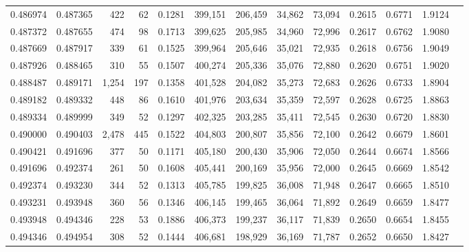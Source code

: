 \begin{tabular}{rrrrrrrrrrrrr}
0.486974 & 0.487365 &   422 &  62 &                                     0.1281 & 399,151 & 206,459 &  34,862 &  73,094 & 0.2615 & 0.6771 & 1.9124 \\
0.487372 & 0.487655 &   474 &  98 &                                     0.1713 & 399,625 & 205,985 &  34,960 &  72,996 & 0.2617 & 0.6762 & 1.9080 \\
0.487669 & 0.487917 &   339 &  61 &                                     0.1525 & 399,964 & 205,646 &  35,021 &  72,935 & 0.2618 & 0.6756 & 1.9049 \\
0.487926 & 0.488465 &   310 &  55 &                                     0.1507 & 400,274 & 205,336 &  35,076 &  72,880 & 0.2620 & 0.6751 & 1.9020 \\
0.488487 & 0.489171 & 1,254 & 197 &                                     0.1358 & 401,528 & 204,082 &  35,273 &  72,683 & 0.2626 & 0.6733 & 1.8904 \\
0.489182 & 0.489332 &   448 &  86 &                                     0.1610 & 401,976 & 203,634 &  35,359 &  72,597 & 0.2628 & 0.6725 & 1.8863 \\
0.489334 & 0.489999 &   349 &  52 &                                     0.1297 & 402,325 & 203,285 &  35,411 &  72,545 & 0.2630 & 0.6720 & 1.8830 \\
0.490000 & 0.490403 & 2,478 & 445 &                                     0.1522 & 404,803 & 200,807 &  35,856 &  72,100 & 0.2642 & 0.6679 & 1.8601 \\
0.490421 & 0.491696 &   377 &  50 &                                     0.1171 & 405,180 & 200,430 &  35,906 &  72,050 & 0.2644 & 0.6674 & 1.8566 \\
0.491696 & 0.492374 &   261 &  50 &                                     0.1608 & 405,441 & 200,169 &  35,956 &  72,000 & 0.2645 & 0.6669 & 1.8542 \\
0.492374 & 0.493230 &   344 &  52 &                                     0.1313 & 405,785 & 199,825 &  36,008 &  71,948 & 0.2647 & 0.6665 & 1.8510 \\
0.493231 & 0.493948 &   360 &  56 &                                     0.1346 & 406,145 & 199,465 &  36,064 &  71,892 & 0.2649 & 0.6659 & 1.8477 \\
0.493948 & 0.494346 &   228 &  53 &                                     0.1886 & 406,373 & 199,237 &  36,117 &  71,839 & 0.2650 & 0.6654 & 1.8455 \\
0.494346 & 0.494954 &   308 &  52 &                                     0.1444 & 406,681 & 198,929 &  36,169 &  71,787 & 0.2652 & 0.6650 & 1.8427 \\

\end{tabular}

